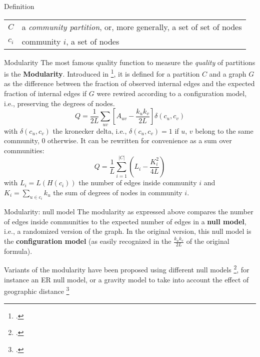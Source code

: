 \begin{textbox}{Definition}
    \begin{tabular}{p{}|p{}}\scriptsize
        $C$   & a \textit{community partition}, or, more generally, a set of set of nodes \\
        $c_i$ & community $i$, a set of nodes                                             \\
    \end{tabular}
\end{textbox}


\begin{textbox}{Modularity}
    The most famous quality function to measure the \textit{quality} of partitions is the \textbf{Modularity}. Introduced in \footcite{girvan2002community}, it is defined for a partition $C$ and a graph $G$ as the difference between the fraction of observed internal edges and the expected fraction of internal edges if $G$ were rewired according to a configuration model, i.e., preserving the degrees of nodes.
    \[
        Q=\frac{1}{2L}\sum_{uv}\left[ A_{uv}-\frac{k_uk_v}{2L}\right] \delta(c_u,c_v)
    \]
    with $\delta(c_u,c_v)$ the kronecker delta, i.e., $\delta(c_u,c_v)=1$ if $u$, $v$ belong to the same community, 0 otherwise.
    It can be rewritten for convenience as a sum over communities:
    \[
        Q=\frac{1}{L}\sum_{i=1}^{|C|}(L_{i}-\frac{K_i^2}{4L})
    \]
    with $L_{i}=L(H(c_i))$ the number of edges inside community $i$ and $K_i=\sum_{u \in c_i}k_u$ the sum of degrees of nodes in community $i$.
\end{textbox}


\begin{textbox}{Modularity: null model}
    The modularity as expressed above compares the number of edges inside communities to the expected number of edges in a \textbf{null model}, i.e., a randomized version of the graph. In the original version, this null model is the \textbf{configuration model} (as easily recognized in the $\frac{k_uk_v}{2L}$ of the original formula).

    Variants of the modularity have been proposed using different null models \footcite{jutla2011generalized}, for instance an ER null model, or a gravity model to take into account the effect of geographic distance \footcite{expert2011uncovering}
\end{textbox}


